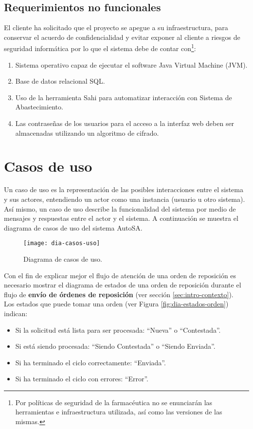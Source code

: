 \subsection{Requerimientos no funcionales}\label{sec:nonfunctional-req}
El cliente ha solicitado que el proyecto se apegue a su infraestructura, para conservar el acuerdo de confidencialidad y evitar exponer al cliente a riesgos de seguridad informática por lo que el sistema debe de contar con\footnote{Por políticas de seguridad de la farmacéutica no se enunciarán las herramientas e infraestructura utilizada, así como las versiones de las mismas.}:
\begin{enumerate}
\item Sistema operativo capaz de ejecutar el software Java Virtual Machine (JVM).
\item Base de datos relacional SQL.
\item Uso de la herramienta Sahi para automatizar interacción con Sistema de Abastecimiento.
\item Las contraseñas de los usuarios para el acceso a la interfaz web deben ser almacenadas utilizando un algoritmo de cifrado.
\end{enumerate}




\section{Casos de uso}\label{sec:casos-uso}
Un caso de uso es la representación de las posibles interacciones entre el sistema y sus actores, entendiendo un actor como una instancia (usuario u otro sistema). Así mismo, un caso de uso describe la funcionalidad del sistema por medio de mensajes y respuestas entre el actor y el sistema\cite{ApressSE}. A continuación se muestra el diagrama de casos de uso del sistema AutoSA.

\begin{figure}[h]
  \centering
  \texttt{[image: dia-casos-uso]} 
  \caption{Diagrama de casos de uso.}
  \label{fig:dia-casos-uso}
\end{figure}

Con el fin de explicar mejor el flujo de atención de una orden de reposición es necesario mostrar el diagrama de estados de una orden de reposición durante el flujo de \textbf{envío de órdenes de reposición} (ver sección \ref{sec:intro-contexto}).\\
Los estados que puede tomar una orden (ver Figura \ref{fig:dia-estados-orden}) indican:
\begin{itemize}
  \item Si la solicitud está lista para ser procesada: ``Nueva'' o ``Contestada''.
  \item Si está siendo procesada: ``Siendo Contestada'' o ``Siendo Enviada''.
  \item Si ha terminado el ciclo correctamente: ``Enviada''.
  \item Si ha terminado el ciclo con errores: ``Error''.
\end{itemize} 

